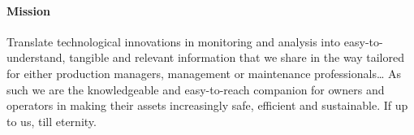 \paragraph{Mission}
Translate technological innovations in monitoring and analysis into easy-to-understand, tangible and relevant information 
that we share in the way tailored for either production managers, management or maintenance professionals…
As such we are the knowledgeable and easy-to-reach companion for owners and operators in making their assets increasingly safe, efficient and sustainable. If up to us, till eternity.
